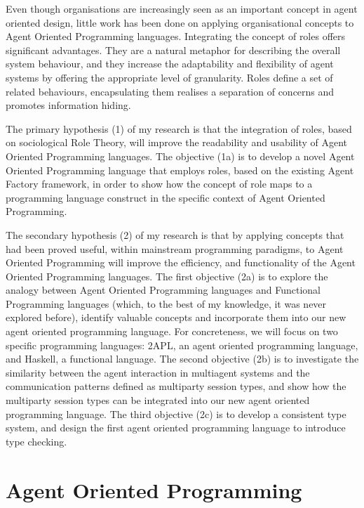 \documentclass[a4paper,12pt,oneside,fleqn]{book} %
\newcommand{\rg}[1]{\marginpar{\tiny\raggedright\textcolor{blue}{\bf rg:} #1}}
\begin{document}
Even though organisations are increasingly seen as an important concept in
agent oriented design, little work has been done on applying organisational
concepts to Agent Oriented Programming languages. Integrating the concept
of roles offers significant advantages. They are a natural metaphor for
describing the overall system behaviour, and they increase the adaptability
and flexibility of agent systems by offering the appropriate level of
granularity. Roles define a set of related behaviours, encapsulating them
realises a separation of concerns and promotes information hiding.

The primary hypothesis (1) of my research is that the integration of roles,
based on sociological Role Theory, will improve the readability and
usability of Agent Oriented Programming languages. The objective (1a) is to
develop a novel Agent Oriented Programming language that employs roles,
based on the existing Agent Factory framework, in order to show how the
concept of role maps to a programming language construct in the specific
context of Agent Oriented Programming.

The secondary hypothesis (2) of my research is that by applying concepts
that had been proved useful, within mainstream programming paradigms, to
Agent Oriented Programming will improve the efficiency, and functionality
of the Agent Oriented Programming languages. The first objective (2a) is to
explore the analogy between Agent Oriented Programming languages and
Functional Programming languages (which, to the best of my knowledge, it
was never explored before), identify valuable concepts and incorporate them
into our new agent oriented programming language. For concreteness, we will
focus on two specific programming languages: 2APL, an agent oriented
programming language, and Haskell, a functional language. The second
objective (2b) is to investigate the similarity between the agent
interaction in multiagent systems and the communication patterns defined as
multiparty session types, and show how the multiparty session types can be
integrated into our new agent oriented programming language. The third
objective (2c) is to develop a consistent type system, and design the first
agent oriented programming language to introduce type checking.



\chapter{Agent Oriented Programming}\label{ch:aop} %
\end{document}

